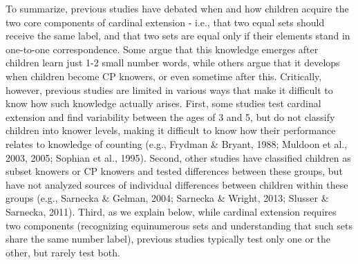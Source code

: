 \documentclass[
  man,floatsintext]{apa7}
\begin{document}
To summarize, previous studies have debated when and how children acquire the two core components of cardinal extension - i.e., that two equal sets should receive the same label, and that two sets are equal only if their elements stand in one-to-one correspondence. Some argue that this knowledge emerges after children learn just 1-2 small number words, while others argue that it develops when children become CP knowers, or even sometime after this. Critically, however, previous studies are limited in various ways that make it difficult to know how such knowledge actually arises. First, some studies test cardinal extension and find variability between the ages of 3 and 5, but do not classify children into knower levels, making it difficult to know how their performance relates to knowledge of counting (e.g., Frydman \& Bryant, 1988; Muldoon et al., 2003, 2005; Sophian et al., 1995). Second, other studies have classified children as subset knowers or CP knowers and tested differences between these groups, but have not analyzed sources of individual differences between children within these groups (e.g., Sarnecka \& Gelman, 2004; Sarnecka \& Wright, 2013; Slusser \& Sarnecka, 2011). Third, as we explain below, while cardinal extension requires two components (recognizing equinumerous sets and understanding that such sets share the same number label), previous studies typically test only one or the other, but rarely test both.
\end{document}
